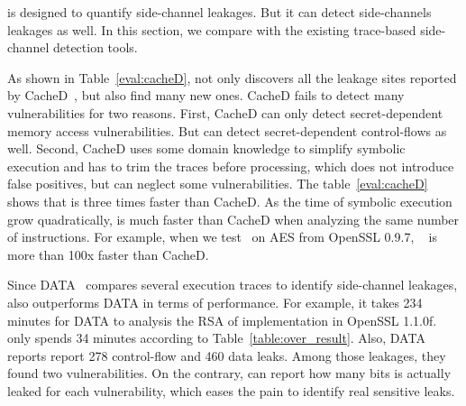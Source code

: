 
\tool{} is designed to quantify side-channel leakages. But it can detect
side-channels leakages as well. In this section, we compare \tool{} with the
existing trace-based side-channel detection tools.

As shown in Table~\ref{eval:cacheD},
\tool{} not only discovers all the leakage sites reported by CacheD~\cite{203878}, but also
find many new ones. CacheD fails to detect many vulnerabilities for two
reasons. First, CacheD can only detect secret-dependent memory access
vulnerabilities. But \tool{} can detect secret-dependent control-flows as well.
Second, CacheD uses some domain
knowledge to simplify symbolic execution and has to trim the traces before
processing, which does not introduce false positives, but can neglect some
vulnerabilities. The table~\ref{eval:cacheD} shows that
\tool{} is three times faster than CacheD. As the time of symbolic execution
grow quadratically, \tool{} is much faster than CacheD when analyzing the same
number of instructions. For example, when we test~\tool{} on AES from OpenSSL
0.9.7, ~\tool{} is more than 100x faster than CacheD.

Since DATA~\cite{217537} compares several execution traces to identify
side-channel leakages, \tool{} also outperforms DATA in terms of performance.
For example, it takes 234 minutes for DATA to analysis the RSA of implementation
in OpenSSL 1.1.0f. \tool{} only spends 34 minutes according to Table~\ref{table:over_result}.
Also, DATA reports report 278 control-flow and 460 data leaks. Among those leakages,
they found two vulnerabilities. On the contrary, \tool{} can report how many bits is
actually leaked for each vulnerability, which eases the pain to identify real sensitive leaks.

